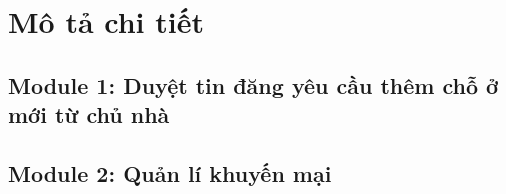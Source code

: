 \section{Mô tả chi tiết}
\subsection{Module 1: Duyệt tin đăng yêu cầu thêm chỗ ở mới từ chủ nhà}

\newpage
\subsection{Module 2: Quản lí khuyến mại}
